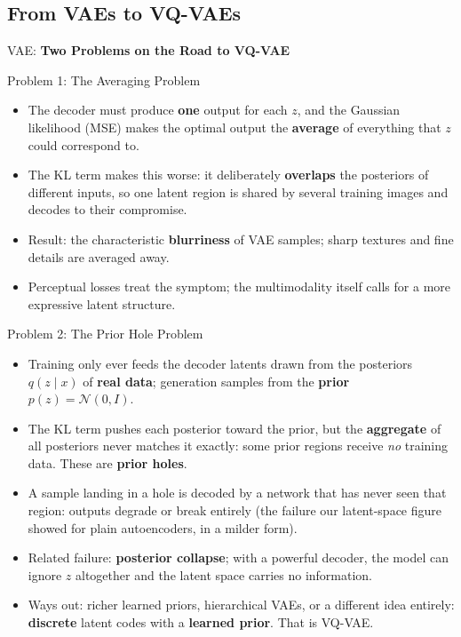 \subsection{From VAEs to VQ-VAEs}
\begin{frame}{}
	\LARGE VAE: \textbf{Two Problems on the Road to VQ-VAE}
\end{frame}

\begin{frame}{Problem 1: The Averaging Problem}
\begin{itemize}
    \item The decoder must produce \textbf{one} output for each $z$, and the Gaussian likelihood (MSE) makes the optimal output the \textbf{average} of everything that $z$ could correspond to.
    \item The KL term makes this worse: it deliberately \textbf{overlaps} the posteriors of different inputs, so one latent region is shared by several training images and decodes to their compromise.
    \item Result: the characteristic \textbf{blurriness} of VAE samples; sharp textures and fine details are averaged away.
    \item Perceptual losses treat the symptom; the multimodality itself calls for a more expressive latent structure.
\end{itemize}
\end{frame}

\begin{frame}{Problem 2: The Prior Hole Problem}
\begin{itemize}
    \item Training only ever feeds the decoder latents drawn from the posteriors $q(z \mid x)$ of \textbf{real data}; generation samples from the \textbf{prior} $p(z) = \mathcal{N}(0, I)$.
    \item The KL term pushes each posterior toward the prior, but the \textbf{aggregate} of all posteriors never matches it exactly: some prior regions receive \emph{no} training data. These are \textbf{prior holes}.
    \item A sample landing in a hole is decoded by a network that has never seen that region: outputs degrade or break entirely (the failure our latent-space figure showed for plain autoencoders, in a milder form).
    \item Related failure: \textbf{posterior collapse}; with a powerful decoder, the model can ignore $z$ altogether and the latent space carries no information.
    \item Ways out: richer learned priors, hierarchical VAEs, or a different idea entirely: \textbf{discrete} latent codes with a \textbf{learned prior}. That is VQ-VAE.
\end{itemize}
\end{frame}
